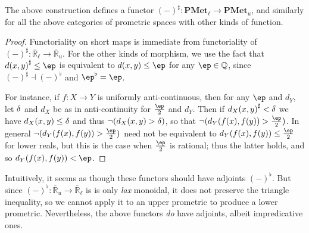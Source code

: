 \documentclass{article}
\def\Q{\mathbb{Q}}
\def\R{\mathbb{R}}
\def\Re{\overline{\R}}
\def\Reu{\Re_u}
\def\Rel{\Re_{\ell}}
\def\upp#1{{#1}^{\sharp}}
\def\low#1{{#1}^{\flat}}
\def\hfep{\frac{\ep}{2}}
\def\PMetu{\mathbf{PMet}_u}
\def\PMetl{\mathbf{PMet}_\ell}
\begin{document}
\begin{thm}
  The above construction defines a functor $\upp{(-)} : \PMetl \to\PMetu$, and similarly for all the above categories of prometric spaces with other kinds of function.
\end{thm}
\begin{proof}
  Functoriality on short maps is immediate from functoriality of $\upp{(-)}:\Rel \to \Reu$.
  For the other kinds of morphism, we use the fact that $\upp{d(x,y)} \le\ep$ is equivalent to $d(x,y) \le\ep$ for any $\ep\in\Q$, since $\upp{(-)}\dashv \low{(-)}$ and $\low{\ep} = \ep$.

  For instance, if $f:X\to Y$ is uniformly anti-continuous, then for any $\ep$ and $d_Y$, let $\delta$ and $d_X$ be as in anti-continuity for $\hfep$ and $d_Y$.
  Then if $\upp{d_X(x,y)} <\de$ we have $d_X(x,y) \le \delta$ and thus $\neg (d_X(x,y) > \delta)$, so that $\neg (d_Y(f(x),f(y))>\hfep)$.
  In general $\neg(d_Y(f(x),f(y))>\hfep)$ need not be equivalent to $d_Y(f(x),f(y))\le\hfep$ for lower reals, but this is the case when $\hfep$ is rational; thus the latter holds, and so $d_Y(f(x),f(y))<\ep$.
\end{proof}

Intuitively, it seems as though these functors should have adjoints $\low{(-)}$.
But since $\low{(-)}:\Reu \to \Rel$ is is only \emph{lax} monoidal, it does not preserve the triangle inequality, so we cannot apply it to an upper prometric to produce a lower prometric.
Nevertheless, the above functors \emph{do} have adjoints, albeit impredicative ones.
\end{document}
